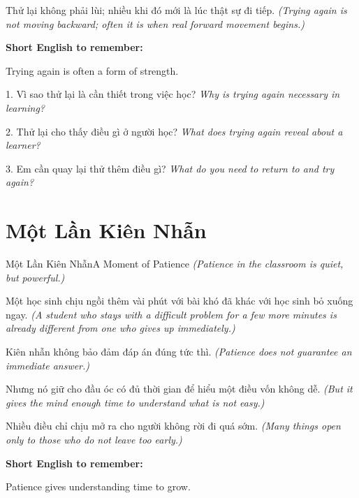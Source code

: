 \begin{baihoc}
Thử lại không phải lùi; nhiều khi đó mới là lúc thật sự đi tiếp.
\textit{(Trying again is not moving backward; often it is when real forward movement begins.)}
\end{baihoc}

\begin{ghinhoanh}
\textbf{Short English to remember:}

Trying again is often a form of strength.

\end{ghinhoanh}

\begin{tuhocnhanh}
1. Vì sao thử lại là cần thiết trong việc học? \textit{Why is trying again necessary in learning?}

2. Thử lại cho thấy điều gì ở người học? \textit{What does trying again reveal about a learner?}

3. Em cần quay lại thử thêm điều gì? \textit{What do you need to return to and try again?}
\end{tuhocnhanh}
\ngancach

\section{Một Lần Kiên Nhẫn}
\begin{truyen}{Một Lần Kiên Nhẫn}{A Moment of Patience}
\textit{(Patience in the classroom is quiet, but powerful.)}

Một học sinh chịu ngồi thêm vài phút với bài khó đã khác với học sinh bỏ xuống ngay.
\textit{(A student who stays with a difficult problem for a few more minutes is already different from one who gives up immediately.)}

Kiên nhẫn không bảo đảm đáp án đúng tức thì.
\textit{(Patience does not guarantee an immediate answer.)}

Nhưng nó giữ cho đầu óc có đủ thời gian để hiểu một điều vốn không dễ.
\textit{(But it gives the mind enough time to understand what is not easy.)}
\end{truyen}

\begin{baihoc}
Nhiều điều chỉ chịu mở ra cho người không rời đi quá sớm.
\textit{(Many things open only to those who do not leave too early.)}
\end{baihoc}

\begin{ghinhoanh}
\textbf{Short English to remember:}

Patience gives understanding time to grow.

\end{ghinhoanh}

